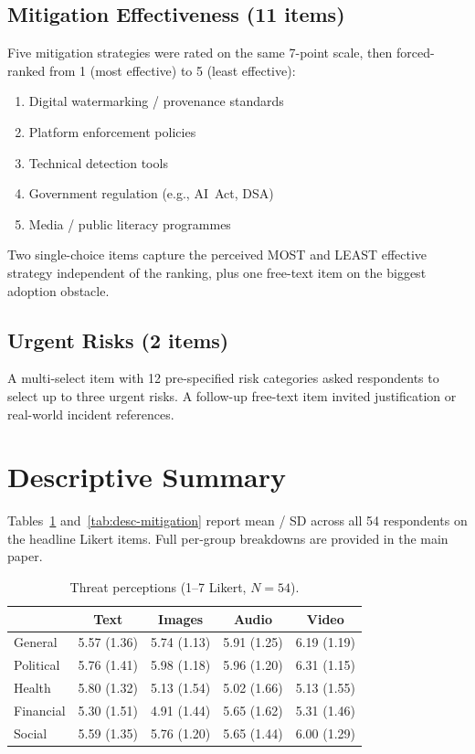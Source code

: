 \subsection{Mitigation Effectiveness (11 items)}
Five mitigation strategies were rated on the same 7-point scale,
then forced-ranked from 1 (most effective) to 5 (least effective):
\begin{enumerate}[label=(\alph*), leftmargin=2.5em]
    \item Digital watermarking / provenance standards
    \item Platform enforcement policies
    \item Technical detection tools
    \item Government regulation (e.g., AI~Act, DSA)
    \item Media / public literacy programmes
\end{enumerate}
Two single-choice items capture the perceived MOST and LEAST effective
strategy independent of the ranking, plus one free-text item on the
biggest adoption obstacle.

\subsection{Urgent Risks (2 items)}
A multi-select item with 12 pre-specified risk categories asked respondents
to select up to three urgent risks. A follow-up free-text item invited
justification or real-world incident references.

\section{Descriptive Summary}
\label{sec:codebook-descriptives}

Tables~\ref{tab:desc-threats} and~\ref{tab:desc-mitigation} report
mean / SD across all 54 respondents on the headline Likert items.
Full per-group breakdowns are provided in the main paper.

\begin{table}[htbp]
\centering
\caption{Threat perceptions (1--7 Likert, $N=54$).}
\label{tab:desc-threats}
\begin{tabular}{lcccc}
\toprule
              & \textbf{Text} & \textbf{Images} & \textbf{Audio} & \textbf{Video} \\
\midrule
General       & 5.57 (1.36) & 5.74 (1.13) & 5.91 (1.25) & 6.19 (1.19) \\
Political     & 5.76 (1.41) & 5.98 (1.18) & 5.96 (1.20) & 6.31 (1.15) \\
Health        & 5.80 (1.32) & 5.13 (1.54) & 5.02 (1.66) & 5.13 (1.55) \\
Financial     & 5.30 (1.51) & 4.91 (1.44) & 5.65 (1.62) & 5.31 (1.46) \\
Social        & 5.59 (1.35) & 5.76 (1.20) & 5.65 (1.44) & 6.00 (1.29) \\
\bottomrule
\end{tabular}
\end{table}

